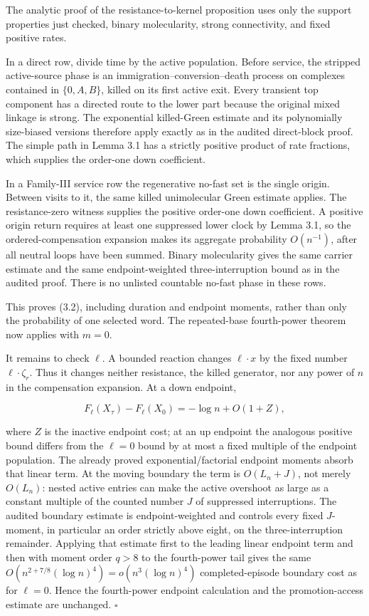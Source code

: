 The analytic proof of the resistance-to-kernel proposition uses only the
support properties just checked, binary molecularity, strong
connectivity, and fixed positive rates.

In a direct row, divide time by the active population. Before service,
the stripped active-source phase is an immigration--conversion--death
process on complexes contained in \(\{0,A,B\}\), killed on its first
active exit. Every transient top component has a directed route to the
lower part because the original mixed linkage is strong. The exponential
killed-Green estimate and its polynomially size-biased versions
therefore apply exactly as in the audited direct-block proof. The simple
path in Lemma 3.1 has a strictly positive product of rate fractions,
which supplies the order-one down coefficient.

In a Family-III service row the regenerative no-fast set is the single
origin. Between visits to it, the same killed unimolecular Green
estimate applies. The resistance-zero witness supplies the positive
order-one down coefficient. A positive origin return requires at least
one suppressed lower clock by Lemma 3.1, so the ordered-compensation
expansion makes its aggregate probability \(O(n^{-1})\), after all
neutral loops have been summed. Binary molecularity gives the same
carrier estimate and the same endpoint-weighted three-interruption bound
as in the audited proof. There is no unlisted countable no-fast phase in
these rows.

This proves (3.2), including duration and endpoint moments, rather than
only the probability of one selected word. The repeated-base
fourth-power theorem now applies with \(m=0\).

It remains to check \(\ell\). A bounded reaction changes
\(\ell\mathbin\cdot x\) by the fixed number
\(\ell\mathbin\cdot\zeta_r\). Thus it changes neither resistance, the
killed generator, nor any power of \(n\) in the compensation expansion.
At a down endpoint,

\[
 F_\ell(X_{\tau})-F_\ell(X_0)=-\log n+O(1+Z),       \tag{3.3}
\]

where \(Z\) is the inactive endpoint cost; at an up endpoint the
analogous positive bound differs from the \(\ell=0\) bound by at most a
fixed multiple of the endpoint population. The already proved
exponential/factorial endpoint moments absorb that linear term. At the
moving boundary the term is \(O(L_n+J)\), not merely \(O(L_n)\): nested
active entries can make the active overshoot as large as a constant
multiple of the counted number \(J\) of suppressed interruptions. The
audited boundary estimate is endpoint-weighted and controls every fixed
\(J\)-moment, in particular an order strictly above eight, on the
three-interruption remainder. Applying that estimate first to the
leading linear endpoint term and then with moment order \(q>8\) to the
fourth-power tail gives the same
\(O(n^{2+7/8}(\log n)^4)=o(n^3(\log n)^4)\) completed-episode boundary
cost as for \(\ell=0\). Hence the fourth-power endpoint calculation and
the promotion-access estimate are unchanged. \(\square\)

